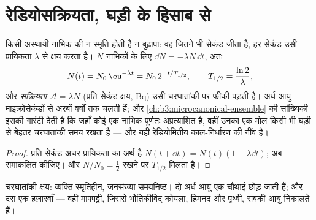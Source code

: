 \section{रेडियोसक्रियता, घड़ी के हिसाब से}

\begin{theorem}[क्षय का नियम]\label{thm:b3:nuclear-physics:decay}
किसी अस्थायी नाभिक की न स्मृति होती है न बुढ़ापा: वह जितने भी सेकंड
जीता है, हर सेकंड उसी प्रायिकता $\lambda$ से क्षय करता है। $N$
नाभिकों के लिए $\dd N = -\lambda N\,\dd t$, अतः
\[
N(t) = N_0\,\eu^{-\lambda t} = N_0\,2^{-t/T_{1/2}} ,
\qquad T_{1/2} = \frac{\ln2}{\lambda} ,
\]
और \emph{सक्रियता} $\mathcal A = \lambda N$ (प्रति सेकंड क्षय,
\unit{Bq}) उसी चरघातांकी पर फीकी पड़ती है। अर्ध-आयु
माइक्रोसेकंडों से अरबों वर्षों तक चलती हैं; और
\cref{ch:b3:microcanonical-ensemble} की सांख्यिकी इसकी गारंटी देती है
कि जहाँ कोई एक नाभिक पूर्णतः अप्रत्याशित है, वहीं उनका एक मोल
किसी भी घड़ी से बेहतर चरघातांकी समय रखता है --- और यही
रेडियोमितीय काल-निर्धारण की नींव है।
\end{theorem}

\begin{proof}
प्रति सेकंड अचर प्रायिकता का अर्थ है $N(t + \dd t) = N(t)(1 -
\lambda\dd t)$; अब समाकलित कीजिए। और $N/N_0 = \tfrac12$ रखने पर
$T_{1/2}$ मिलता है।
\end{proof}

\begin{omfigure}

{\small चरघातांकी क्षय: व्यक्ति स्मृतिहीन, जनसंख्या समयनिष्ठ।
दो अर्ध-आयु एक चौथाई छोड़ जाती हैं; और दस एक
हज़ारवाँ --- वही मापपट्टी, जिससे भौतिकीविद् कोयला, हिमनद और पृथ्वी,
सबकी आयु निकालते हैं।}
\end{omfigure}

